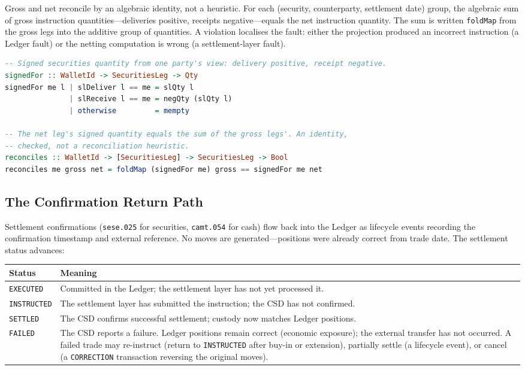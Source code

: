 \documentclass[11pt,a4paper]{article}
\begin{document}
Gross and net reconcile by an algebraic identity, not a heuristic. For each (security, counterparty, settlement date) group, the algebraic sum of gross instruction quantities---deliveries positive, receipts negative---equals the net instruction quantity. The sum is written \texttt{foldMap} from the gross legs into the additive group of quantities. A violation localises the fault: either the projection produced an incorrect instruction (a Ledger fault) or the netting computation is wrong (a settlement-layer fault).

\begin{lstlisting}[language=Haskell]
-- Signed securities quantity from one party's view: delivery positive, receipt negative.
signedFor :: WalletId -> SecuritiesLeg -> Qty
signedFor me l | slDeliver l == me = slQty l
               | slReceive l == me = negQty (slQty l)
               | otherwise         = mempty

-- The net leg's signed quantity equals the sum of the gross legs'. An identity,
-- checked, not a reconciliation heuristic.
reconciles :: WalletId -> [SecuritiesLeg] -> SecuritiesLeg -> Bool
reconciles me gross net = foldMap (signedFor me) gross == signedFor me net
\end{lstlisting}

\subsection{The Confirmation Return Path}
\label{sec:settlement-confirmation}

Settlement confirmations (\texttt{sese.025} for securities, \texttt{camt.054} for cash) flow back into the Ledger as lifecycle events recording the confirmation timestamp and external reference. No moves are generated---positions were already correct from trade date. The settlement status advances:

\begin{center}
\begin{tabular}{l p{10.5cm}}
\toprule
\textbf{Status} & \textbf{Meaning} \\
\midrule
\texttt{EXECUTED}   & Committed in the Ledger; the settlement layer has not yet processed it. \\
\texttt{INSTRUCTED} & The settlement layer has submitted the instruction; the CSD has not confirmed. \\
\texttt{SETTLED}    & The CSD confirms successful settlement; custody now matches Ledger positions. \\
\texttt{FAILED}     & The CSD reports a failure. Ledger positions remain correct (economic exposure); the external transfer has not occurred. A failed trade may re-instruct (return to \texttt{INSTRUCTED} after buy-in or extension), partially settle (a lifecycle event), or cancel (a \texttt{CORRECTION} transaction reversing the original moves). \\
\bottomrule
\end{tabular}
\end{center}
\end{document}

